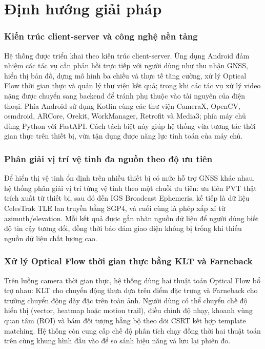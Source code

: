 \documentclass[../DoAn.tex]{subfiles}
\begin{document}
\section{Định hướng giải pháp}
\label{section:1.3}
\setcounter{subsubsection}{0}
\subsubsection{Kiến trúc client-server và công nghệ nền tảng}
Hệ thống được triển khai theo kiến trúc client-server. Ứng dụng Android đảm nhiệm các tác vụ cần phản hồi trực tiếp với người dùng như thu nhận GNSS, hiển thị bản đồ, dựng mô hình ba chiều và thực tế tăng cường, xử lý Optical Flow thời gian thực và quản lý thư viện kết quả; trong khi các tác vụ xử lý video nặng được chuyển sang backend để tránh phụ thuộc vào tài nguyên của điện thoại. Phía Android sử dụng Kotlin cùng các thư viện CameraX, OpenCV, osmdroid, ARCore, Orekit, WorkManager, Retrofit và Media3; phía máy chủ dùng Python với FastAPI. Cách tách biệt này giúp hệ thống vừa tương tác thời gian thực trên thiết bị, vừa tận dụng được năng lực tính toán của máy chủ.

\subsubsection{Phân giải vị trí vệ tinh đa nguồn theo độ ưu tiên}
Để hiển thị vệ tinh ổn định trên nhiều thiết bị có mức hỗ trợ GNSS khác nhau, hệ thống phân giải vị trí từng vệ tinh theo một chuỗi ưu tiên: ưu tiên PVT thật trích xuất từ thiết bị, sau đó đến IGS Broadcast Ephemeris, kế tiếp là dữ liệu CelesTrak TLE lan truyền bằng SGP4, và cuối cùng là phép xấp xỉ từ azimuth/elevation. Mỗi kết quả được gắn nhãn nguồn dữ liệu để người dùng biết độ tin cậy tương đối, đồng thời bảo đảm giao diện không bị trống khi thiếu nguồn dữ liệu chất lượng cao.

\subsubsection{Xử lý Optical Flow thời gian thực bằng KLT và Farneback}
Trên luồng camera thời gian thực, hệ thống dùng hai thuật toán Optical Flow bổ trợ nhau: KLT cho chuyển động thưa dựa trên điểm đặc trưng và Farneback cho trường chuyển động dày đặc trên toàn ảnh. Người dùng có thể chuyển chế độ hiển thị (vector, heatmap hoặc motion trail), điều chỉnh độ nhạy, khoanh vùng quan tâm (ROI) và bám đối tượng bằng bộ theo dõi CSRT kết hợp template matching. Hệ thống còn cung cấp chế độ phân tích chạy đồng thời hai thuật toán trên cùng khung hình đầu vào để so sánh hiệu năng và lưu lại phiên đo.
\end{document}
